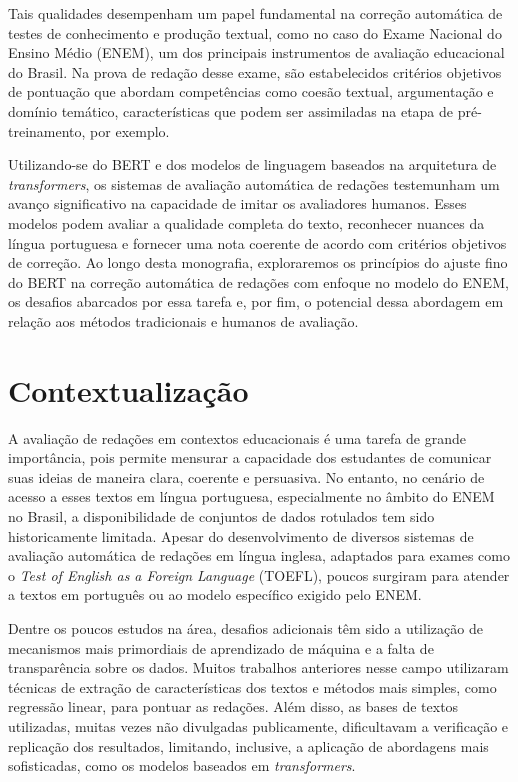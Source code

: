 Tais qualidades desempenham um papel fundamental na correção automática de testes de conhecimento e produção textual, como no caso do Exame Nacional do Ensino Médio (ENEM), um dos principais instrumentos de avaliação educacional do Brasil. Na prova de redação desse exame, são estabelecidos critérios objetivos de pontuação que abordam competências como coesão textual, argumentação e domínio temático, características que podem ser assimiladas na etapa de pré-treinamento, por exemplo.

Utilizando-se do BERT e dos modelos de linguagem baseados na arquitetura de \textit{transformers}, os sistemas de avaliação automática de redações testemunham um avanço significativo na capacidade de imitar os avaliadores humanos. Esses modelos podem avaliar a qualidade completa do texto, reconhecer nuances da língua portuguesa e fornecer uma nota coerente de acordo com critérios objetivos de correção. Ao longo desta monografia, exploraremos os princípios do ajuste fino do BERT na correção automática de redações com enfoque no modelo do ENEM, os desafios abarcados por essa tarefa e, por fim, o potencial dessa abordagem em relação aos métodos tradicionais e humanos de avaliação.

\section{Contextualização}

A avaliação de redações em contextos educacionais é uma tarefa de grande importância, pois permite mensurar a capacidade dos estudantes de comunicar suas ideias de maneira clara, coerente e persuasiva. No entanto, no cenário de acesso a esses textos em língua portuguesa, especialmente no âmbito do ENEM no Brasil, a disponibilidade de conjuntos de dados rotulados tem sido historicamente limitada. Apesar do desenvolvimento de diversos sistemas de avaliação automática de redações em língua inglesa, adaptados para exames como o \textit{Test of English as a Foreign Language} (TOEFL), poucos surgiram para atender a textos em português ou ao modelo específico exigido pelo ENEM.

Dentre os poucos estudos na área, desafios adicionais têm sido a utilização de mecanismos mais primordiais de aprendizado de máquina e a falta de transparência sobre os dados. Muitos trabalhos anteriores nesse campo utilizaram técnicas de extração de características dos textos e métodos mais simples, como regressão linear, para pontuar as redações. Além disso, as bases de textos utilizadas, muitas vezes não divulgadas publicamente, dificultavam a verificação e replicação dos resultados, limitando, inclusive, a aplicação de abordagens mais sofisticadas, como os modelos baseados em \textit{transformers}.

